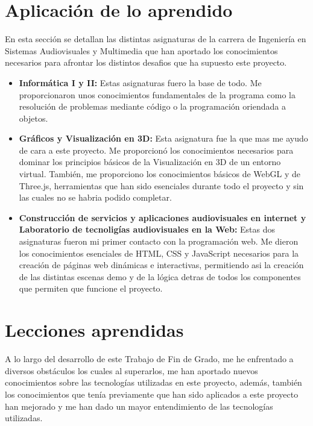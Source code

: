 \documentclass[a4paper, 12pt]{book}
\begin{document}
\section{Aplicación de lo aprendido}
\label{sec:aplicacion}

En esta sección se detallan las distintas asignaturas de la carrera de Ingeniería en Sistemas Audiovisuales y Multimedia que han aportado los conocimientos necesarios para afrontar los distintos desafios que ha supuesto este proyecto. 

\begin{itemize}
  \item \textbf{Informática I y II:} Estas asignaturas fuero la base de todo. Me proporcionaron unos conocimientos fundamentales de la programa como la resolución de problemas mediante código o la programación oriendada a objetos.
  \item \textbf{Gráficos y Visualización en 3D:} Esta asignatura fue la que mas me ayudo de cara a este proyecto. Me proporcionó los conocimientos necesarios para dominar los principios básicos de la Visualización en 3D de un entorno virtual. También, me proporciono los conocimientos básicos de WebGL y de Three.js, herramientas que han sido esenciales durante todo el proyecto y sin las cuales no se habria podido completar. 
  \item \textbf{Construcción de servicios y aplicaciones audiovisuales en internet y Laboratorio de tecnoligías audiovisuales en la Web:} Estas dos asignaturas fueron mi primer contacto con la programación web. Me dieron los conocimientos esenciales de HTML, CSS y JavaScript necesarios para la creación de páginas web dinámicas e interactivas, permitiendo asi la creación de las distintas escenas demo y de la lógica detras de todos los componentes que permiten que funcione el proyecto.
\end{itemize}

\section{Lecciones aprendidas}
\label{sec:lecciones_aprendidas}

A lo largo del desarrollo de este Trabajo de Fin de Grado, me he enfrentado a diversos obstáculos los cuales al superarlos, me han aportado nuevos conocimientos sobre las tecnologías utilizadas en este proyecto, además, también los conocimientos que tenía previamente que han sido aplicados a este proyecto han mejorado y me han dado un mayor entendimiento de las tecnologías utilizadas.
\end{document}
